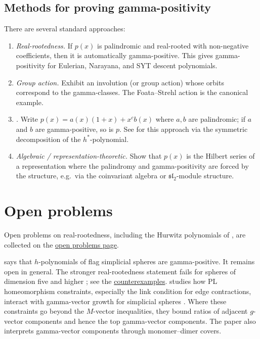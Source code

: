 \subsection[gammaPositivityMethods]{Methods for proving gamma-positivity}

There are several standard approaches:

\begin{enumerate}

\item \emph{Real-rootedness.}
If $p(x)$ is palindromic and real-rooted with non-negative coefficients,
then it is automatically gamma-positive.
This gives gamma-positivity for Eulerian, Narayana, and SYT descent polynomials.

\item \emph{Group action.}
Exhibit an involution (or group action) whose orbits correspond to the gamma-classes.
The Foata--Strehl action is the canonical example.

\item \emph{\label{symmetricDecompositionMethod}.}
Write $p(x) = a(x)(1+x) + x^c b(x)$ where $a,b$ are palindromic;
if $a$ and $b$ are gamma-positive, so is $p$.
See \cite{BrandenSolus2019} for this approach via the symmetric decomposition
of the $h^*$-polynomial.

\item \emph{Algebraic / representation-theoretic.}
Show that $p(x)$ is the Hilbert series of a representation where the palindromy
and gamma-positivity are forced by the structure, e.g.\ via
the coinvariant algebra or $\mathfrak{sl}_2$-module structure.

\end{enumerate}


\section[gammaPositivityOpenProblems]{Open problems}

Open problems on real-rootedness, including the Hurwitz polynomials of
\cite{CoulterDoMoskovsky2023x}, are collected on the
\hyperref[realrootedOpenProblems]{open problems page}.

\label{galConjecture} \cite{Gal2005} says that
$h$-polynomials of flag simplicial spheres are gamma-positive.  It remains
open in general.  The stronger real-rootedness statement fails for spheres of
dimension five and higher \cite{Gal2005}; see the
\hyperref[counterexamplesPosets]{counterexamples}.
 studies how PL homeomorphism constraints, especially the
link condition for edge contractions, interact with gamma-vector growth for
simplicial spheres \cite{Park2026x}.  Where these constraints go beyond the
$M$-vector inequalities, they bound ratios of adjacent $g$-vector components
and hence the top gamma-vector components.  The paper also interprets
gamma-vector components through monomer--dimer covers.

